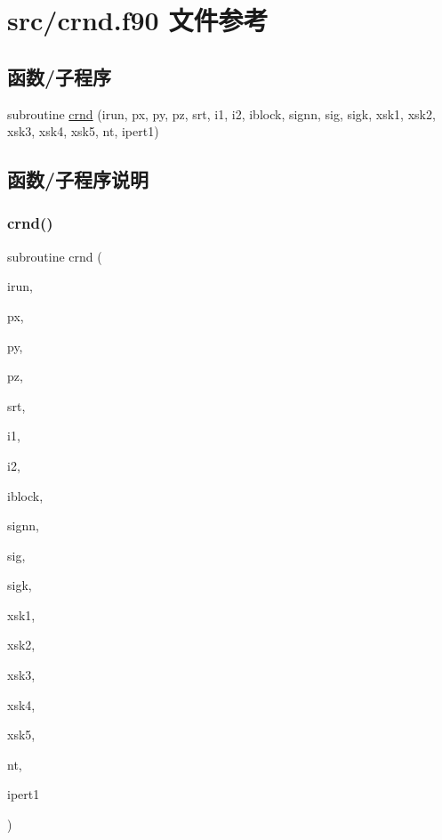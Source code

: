 \hypertarget{crnd_8f90}{}\section{src/crnd.f90 文件参考}
\label{crnd_8f90}
\subsection*{函数/子程序}
\begin{DoxyCompactItemize}
\item 
subroutine \mbox{\hyperlink{crnd_8f90_ad43364065dc3cc3bbe0f9c5a2d4e2600}{crnd}} (irun, px, py, pz, srt, i1, i2, iblock, signn, sig, sigk, xsk1, xsk2, xsk3, xsk4, xsk5, nt, ipert1)
\end{DoxyCompactItemize}


\subsection{函数/子程序说明}
\mbox{\label{crnd_8f90_ad43364065dc3cc3bbe0f9c5a2d4e2600}} 
\subsubsection{\texorpdfstring{crnd()}{crnd()}}
{\footnotesize\ttfamily subroutine crnd (\begin{DoxyParamCaption}\item[{}]{irun,  }\item[{}]{px,  }\item[{}]{py,  }\item[{}]{pz,  }\item[{}]{srt,  }\item[{}]{i1,  }\item[{}]{i2,  }\item[{}]{iblock,  }\item[{}]{signn,  }\item[{}]{sig,  }\item[{}]{sigk,  }\item[{}]{xsk1,  }\item[{}]{xsk2,  }\item[{}]{xsk3,  }\item[{}]{xsk4,  }\item[{}]{xsk5,  }\item[{}]{nt,  }\item[{}]{ipert1 }\end{DoxyParamCaption})}



